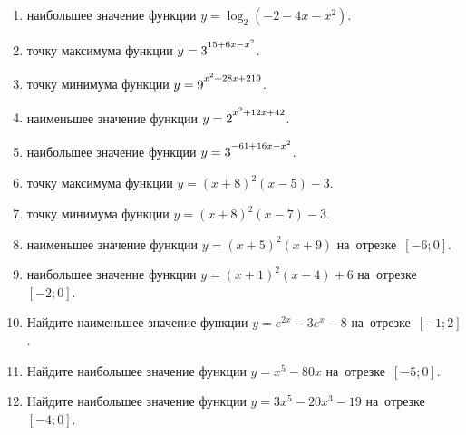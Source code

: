 \documentclass[a4paper,10pt]{article}
\begin{document}
\begin{enumerate}
\item {} наибольшее значение функции $y=\log_2\left(-2-4x-x^2\right)$.

\item {} точку максимума функции $y=3\strut^{15+6x-x^2}$.

\item {} точку минимума функции $y=9\strut^{x^2+28x+219}$.

\item {} наименьшее значение функции $y=2\strut^{x^2+12x+42}$.

\item {} наибольшее значение функции $y=3\strut^{-61+16x-x^2}$.

\item {} точку максимума функции $y=\left(x+8\right)^2\left(x-5\right)-3$.

\item {} точку минимума функции $y=\left(x+8\right)^2\left(x-7\right)-3$.

\item {} наименьшее значение функции $y=\left(x+5\right)^2\left(x+9\right)$ на~отрезке~$\left[-6;0\right]$.

\item {} наибольшее значение функции $y=\left(x+1\right)^2\left(x-4\right)+6$ на~отрезке~$\left[-2;0\right]$.

\item Найдите наименьшее значение функции $y=e^{2x}-3e^x-8$ на~отрезке~$\left[-1;2\right]$.

\item Найдите наибольшее значение функции $y=x^5-80x$ на~отрезке~$\left[-5;0\right]$.

\item Найдите наибольшее значение функции $y=3x^5-20x^3-19$ на~отрезке~$\left[-4;0\right]$.

\end{enumerate}
\end{document}
